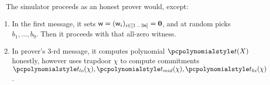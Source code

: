 \ \newline
The \plonk{} simulator proceeds as an honest prover would, except:
\begin{enumerate}
  \item In the first message, it sets $\wit = (\wit_i)_{i \in \range{1}{3 \noofc}}
    = \vec{0}$, and at random picks $b_1, \ldots, b_9$. Then it proceeds with
    that all-zero witness.
  \item In prover's $3$-rd message, it computes polynomial $\pt(X)$ honestly, however uses
    trapdoor $\chi$ to compute commitments
    $\p{t_{lo}}(\chi), \p{t_{mid}}(\chi), \p{t_{hi}}(\chi)$.
  \end{enumerate}

 
